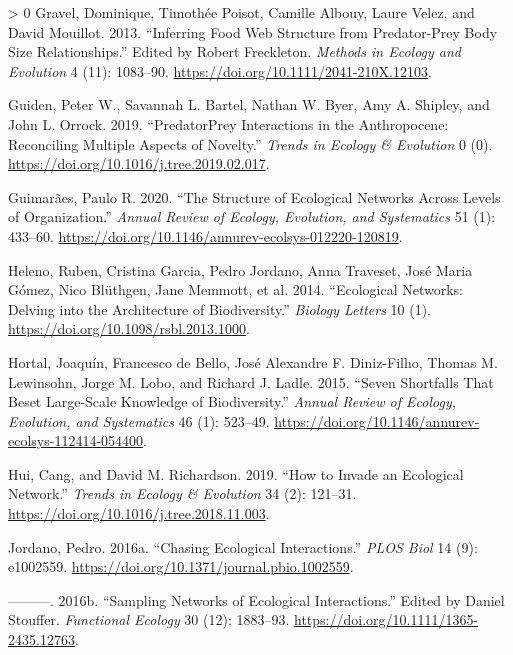 \documentclass[11pt]{article}
\newlength{\cslhangindent}
\newenvironment{CSLReferences}[3] %
 {%
  \setlength{\parindent}{0pt}
  \ifodd #1 \everypar{\setlength{\hangindent}{\cslhangindent}}\ignorespaces\fi
  \ifnum #2 > 0
  \setlength{\parskip}{#2\baselineskip}
  \fi
 }%
 {}
\begin{document}
\begin{CSLReferences}{1}{0}
\leavevmode\hypertarget{ref-Gravel2013InfFoo}{}%
Gravel, Dominique, Timothée Poisot, Camille Albouy, Laure Velez, and
David Mouillot. 2013. {``Inferring Food Web Structure from Predator-Prey
Body Size Relationships.''} Edited by Robert Freckleton. \emph{Methods
in Ecology and Evolution} 4 (11): 1083--90.
\url{https://doi.org/10.1111/2041-210X.12103}.

\leavevmode\hypertarget{ref-Guiden2019PrePre}{}%
Guiden, Peter W., Savannah L. Bartel, Nathan W. Byer, Amy A. Shipley,
and John L. Orrock. 2019. {``PredatorPrey Interactions in the
Anthropocene: Reconciling Multiple Aspects of Novelty.''} \emph{Trends
in Ecology \& Evolution} 0 (0).
\url{https://doi.org/10.1016/j.tree.2019.02.017}.

\leavevmode\hypertarget{ref-Guimaraes2020StrEco}{}%
Guimarães, Paulo R. 2020. {``The Structure of Ecological Networks Across
Levels of Organization.''} \emph{Annual Review of Ecology, Evolution,
and Systematics} 51 (1): 433--60.
\url{https://doi.org/10.1146/annurev-ecolsys-012220-120819}.

\leavevmode\hypertarget{ref-Heleno2014EcoNet}{}%
Heleno, Ruben, Cristina Garcia, Pedro Jordano, Anna Traveset, José Maria
Gómez, Nico Blüthgen, Jane Memmott, et al. 2014. {``Ecological Networks:
Delving into the Architecture of Biodiversity.''} \emph{Biology Letters}
10 (1). \url{https://doi.org/10.1098/rsbl.2013.1000}.

\leavevmode\hypertarget{ref-Hortal2015SevSho}{}%
Hortal, Joaquín, Francesco de Bello, José Alexandre F. Diniz-Filho,
Thomas M. Lewinsohn, Jorge M. Lobo, and Richard J. Ladle. 2015. {``Seven
Shortfalls That Beset Large-Scale Knowledge of Biodiversity.''}
\emph{Annual Review of Ecology, Evolution, and Systematics} 46 (1):
523--49. \url{https://doi.org/10.1146/annurev-ecolsys-112414-054400}.

\leavevmode\hypertarget{ref-Hui2019HowInv}{}%
Hui, Cang, and David M. Richardson. 2019. {``How to Invade an Ecological
Network.''} \emph{Trends in Ecology \& Evolution} 34 (2): 121--31.
\url{https://doi.org/10.1016/j.tree.2018.11.003}.

\leavevmode\hypertarget{ref-Jordano2016ChaEco}{}%
Jordano, Pedro. 2016a. {``Chasing Ecological Interactions.''} \emph{PLOS
Biol} 14 (9): e1002559.
\url{https://doi.org/10.1371/journal.pbio.1002559}.

\leavevmode\hypertarget{ref-Jordano2016SamNet}{}%
---------. 2016b. {``Sampling Networks of Ecological Interactions.''}
Edited by Daniel Stouffer. \emph{Functional Ecology} 30 (12): 1883--93.
\url{https://doi.org/10.1111/1365-2435.12763}.


\end{CSLReferences}
\end{document}
